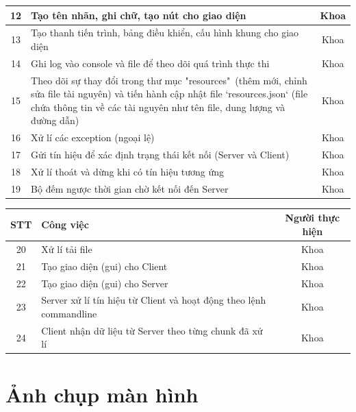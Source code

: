 \documentclass[a4paper,12pt]{report}
\begin{document}
\begin{center}
\begin{tabular}{|c|p{}|c|}
    12           & Tạo tên nhãn, ghi chữ, tạo nút cho giao diện                                                      & Khoa             \\\hline
    13           & Tạo thanh tiến trình, bảng điều khiển, cấu hình khung cho giao diện                           & Khoa             \\\hline
    14           & Ghi log vào console và file để theo dõi quá trình thực thi                & Khoa             \\\hline
    15           & Theo dõi sự thay đổi trong thư mục "resources"~(thêm mới, chỉnh sửa file tài nguyên) và tiến hành cập nhật file `resources.json` (file chứa thông tin về các tài nguyên như tên file, dung lượng và đường dẫn) & Khoa             \\\hline
    16           & Xử lí các exception (ngoại lệ)                & Khoa             \\\hline
    17           & Gửi tín hiệu để xác định trạng thái kết nối (Server và Client)         & Khoa             \\\hline
    18           & Xử lí thoát và dừng khi có tín hiệu tương ứng              & Khoa             \\\hline
    19           & Bộ đếm ngược thời gian chờ kết nối đến Server                & Khoa             \\\hline
    \end{tabular}
\pagebreak
\begin{tabular}{|c|p{}|c|}
    \hline
    \textbf{STT} & \textbf{Công việc} & \textbf{Người thực hiện} \\\hline
    20           & Xử lí tải file                 & Khoa             \\\hline
    21           & Tạo giao diện (gui) cho Client               & Khoa             \\\hline
    22           & Tạo giao diện (gui) cho Server               & Khoa             \\\hline
    23           & Server xử lí tín hiệu từ Client và hoạt động theo lệnh commandline               & Khoa             \\\hline
    24           & Client nhận dữ liệu từ Server theo từng chunk đã xử lí             & Khoa
    \\\hline
  \end{tabular}
\end{center}

\pagebreak
\section{Ảnh chụp màn hình}
\end{document}
